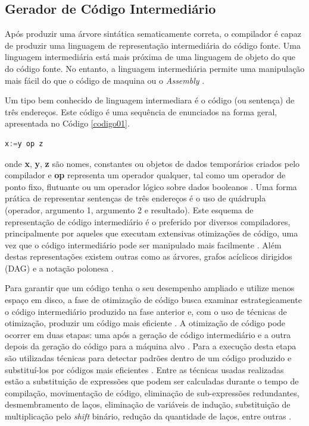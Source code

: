 \subsection{Gerador de Código Intermediário}

Após produzir uma árvore sintática sematicamente correta, o compilador é capaz de
 produzir uma linguagem de representação intermediária do código fonte. Uma linguagem 
intermediária está mais próxima de uma linguagem de objeto do que do código fonte. 
No entanto, a linguagem  intermediária permite uma manipulação mais fácil do que o 
código de maquina ou o \textit{Assembly} \cite{ref25}. 

Um tipo bem conhecido de linguagem intermediara é o código (ou sentença) de três 
endereços\cite{ref26}. Este código é uma sequência de enunciados na forma geral, apresentada 
 no Código \ref{codigo01}.


\begin{lstlisting}[language=C++,frame=single,captionpos=b,caption={
								Código de três endereços},
											label=codigo01]
   x:=y op z
\end{lstlisting}


onde \textbf{x}, \textbf{y}, \textbf{z} são nomes, constantes ou objetos de dados 
temporários criados pelo compilador e \textbf{op} representa um operador qualquer,
 tal como um operador de ponto fixo, flutuante ou um operador lógico sobre dados
 booleanos \cite{ref27}. Uma forma prática de representar sentenças de três endereços é o uso
 de quádrupla (operador, argumento 1, argumento 2 e resultado). 
Este esquema de representação de código intermediário é o preferido por diversos
 compiladores, principalmente por aqueles que executam extensivas otimizações de
 código, uma vez que o código intermediário pode ser manipulado mais 
facilmente \cite{ref28}. Além destas representações existem outras como as 
árvores, grafos acíclicos dirigidos (DAG) e a notação polonesa \cite{ref29}.

Para garantir que um código tenha o seu desempenho ampliado e utilize menos 
espaço em disco, a fase de otimização de código busca examinar 
estrategicamente o código intermediário produzido na fase anterior e, com o 
uso de técnicas de otimização, produzir um código mais eficiente \cite{ref30}
. A otimização de código pode ocorrer em duas etapas: uma após a geração de 
código intermediário e a outra depois da geração do código para a máquina 
alvo \cite{ref31}. 
Para a execução desta etapa são utilizadas técnicas para detectar 
padrões dentro de um código produzido e substituí-los por códigos mais
 eficientes \cite{ref28}. Entre as técnicas usadas realizadas estão a 
substituição de expressões que podem ser calculadas durante o tempo 
de compilação, movimentação de código, eliminação de sub-expressões 
redundantes, desmembramento de laços, eliminação de variáveis de indução, 
substituição de multiplicação pelo \textit{shift} binário, redução da 
quantidade de laços, entre outras \cite{ref30}.

